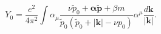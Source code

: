 \begin{equation}
\label{eq4}
Y_0 = \frac{e^2}{4\pi^2}\int \alpha _\mu
\frac{\nu\tilde{p}_0 + {\bm \alpha} \bm{\tilde{p}} + \beta  m}
{\tilde{p}_0(\tilde {p}_0 + |{\bm k}| - \nu p_0 )}
\alpha^\mu \frac{d{\bm k}}{|{\bm k}|}.
\end{equation}

